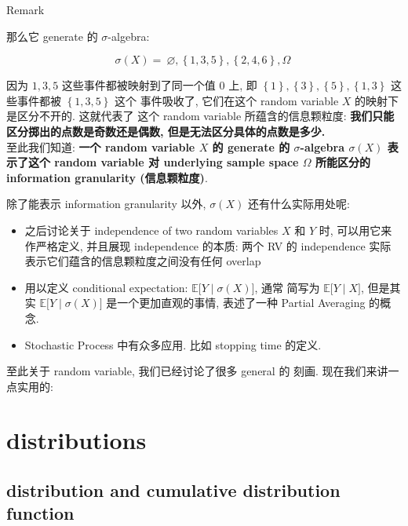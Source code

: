\documentclass{qlnotes-export}
\begin{document}
\begin{qlremark}{Remark}
\begin{example}
那么它 generate 的 \(\sigma\)-algebra:

\[\sigma(X) = \ \varnothing,\left\{ {1,3,5} \right\},\left\{ {2,4,6} \right\},\Omega\ \]

因为 \(1,3,5\) 这些事件都被映射到了同一个值 \(0\) 上, 即 \(\left\{ 1 \right\},\left\{ 3 \right\},\left\{ 5 \right\},\left\{ {1,3} \right\}\) 这些事件都被 \(\left\{ {1,3,5} \right\}\) 这个 事件吸收了, 它们在这个 random variable \(X\) 的映射下是区分不开的. 这就代表了 这个 random variable 所蕴含的信息颗粒度: \textbf{我们只能区分掷出的点数是奇数还是偶数, 但是无法区分具体的点数是多少.}\\
至此我们知道: \textbf{一个 random variable \(X\) 的 generate 的 \(\sigma\)-algebra \(\sigma(X)\) 表示了这个 random variable 对 underlying sample space \(\Omega\) 所能区分的 information granularity (信息颗粒度)}.\\

\end{example}

\end{qlremark}

除了能表示 information granularity 以外, \(\sigma(X)\) 还有什么实际用处呢:

\begin{itemize}
\item
  之后讨论关于 independence of two random variables \(X\) 和 \(Y\) 时, 可以用它来作严格定义, 并且展现 independence 的本质: 两个 RV 的 independence 实际表示它们蕴含的信息颗粒度之间没有任何 overlap
\item
  用以定义 conditional expectation: \(\left. {\mathbb{E}}\lbrack Y \middle| \sigma(X)\rbrack \right.\), 通常 简写为 \(\left. {\mathbb{E}}\lbrack Y \middle| X\rbrack \right.\), 但是其实 \(\left. {\mathbb{E}}\lbrack Y \middle| \sigma(X)\rbrack \right.\) 是一个更加直观的事情, 表述了一种 Partial Averaging 的概念.
\item
  Stochastic Process 中有众多应用. 比如 stopping time 的定义.
\end{itemize}

至此关于 random variable, 我们已经讨论了很多 general 的 刻画. 现在我们来讲一点实用的:

\section{distributions}\label{distributions}

\subsection{distribution and cumulative distribution function}\label{distribution-and-cumulative-distribution-function}
\end{document}
